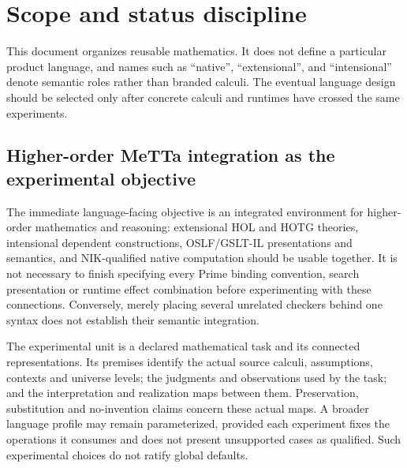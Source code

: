 \documentclass[11pt]{article}
\theoremstyle{definition}
\theoremstyle{remark}
\begin{document}
\tableofcontents

\section{Scope and status discipline}

This document organizes reusable mathematics.  It does not define a particular
product language, and names such as ``native'', ``extensional'', and
``intensional'' denote semantic roles rather than branded calculi.  The eventual
language design should be selected only after concrete calculi and runtimes have
crossed the same experiments.

\subsection{Higher-order MeTTa integration as the experimental objective}

The immediate language-facing objective is an integrated environment for
higher-order mathematics and reasoning: extensional HOL and HOTG theories,
intensional dependent constructions, OSLF/GSLT-IL presentations and semantics,
and NIK-qualified native computation should be usable together. It is not
necessary to finish specifying every Prime binding convention, search
presentation or runtime effect combination before experimenting with these
connections. Conversely, merely placing several unrelated checkers behind
one syntax does not establish their semantic integration.

The experimental unit is a declared mathematical task and its connected
representations. Its premises identify the actual source calculi, assumptions,
contexts and universe levels; the judgments and observations used by the task;
and the interpretation and realization maps between them. Preservation,
substitution and no-invention claims concern these actual maps. A broader
language profile may remain parameterized, provided each experiment fixes the
operations it consumes and does not present unsupported cases as qualified.
Such experimental choices do not ratify global defaults.
\end{document}
